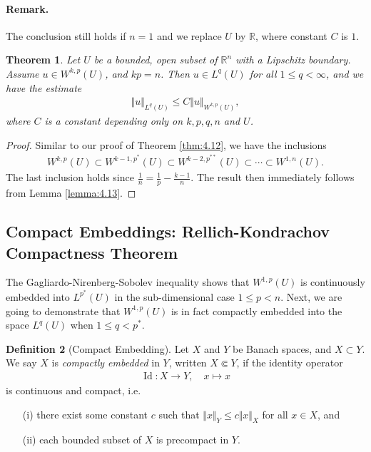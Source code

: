 \documentclass{article}
\numberwithin{equation}{section}
\newcommand{\bbR}{\mathbb{R}}
\DeclareMathOperator{\id}{Id}
\theoremstyle{plain}
\newtheorem{theorem}{Theorem}[section]
\theoremstyle{definition}
\newtheorem{definition}[theorem]{Definition}
\begin{document}
\paragraph{Remark.} The conclusion still holds if $n=1$ and we replace $U$ by $\bbR$, where constant $C$ is $1$.

\begin{theorem}\label{thm:4.14}
Let $U$ be a bounded, open subset of $\bbR^n$ with a Lipschitz boundary. Assume $u\in W^{k,p}(U)$, and $kp=n$. Then $u\in L^q(U)$ for all $1\leq q<\infty$, and we have the estimate
\begin{align*}
	\Vert u\Vert_{L^q(U)}\leq C\Vert u\Vert_{W^{k,p}(U)},
\end{align*}
where $C$ is a constant depending only on $k,p,q,n$ and $U$.
\end{theorem}
\begin{proof}
Similar to our proof of Theorem \ref{thm:4.12}, we have the inclusions
\begin{align*}
	W^{k,p}(U)\subset W^{k-1,p^*}(U)\subset W^{k-2,p^{**}}(U)\subset\cdots\subset W^{1,n}(U).
\end{align*}
The last inclusion holds since $\frac{1}{n}=\frac{1}{p}-\frac{k-1}{n}$. The result then immediately follows from Lemma \ref{lemma:4.13}.
\end{proof}

\newpage
\subsection{Compact Embeddings: Rellich-Kondrachov Compactness Theorem}
The Gagliardo-Nirenberg-Sobolev inequality shows that $W^{1,p}(U)$ is continuously embedded into $L^{p^*}(U)$ in the sub-dimensional case $1\leq p <n$. Next, we are going to demonstrate that $W^{1,p}(U)$ is in fact compactly embedded
into the space $L^q(U)$ when $1\leq q<p^*$.

\begin{definition}[Compact Embedding]\label{compactembedding}
Let $X$ and $Y$ be Banach spaces, and $X\subset Y$. We say $X$ is \textit{compactly embedded} in $Y$, written $X\Subset Y$, if the identity operator
\begin{align*}
	\id:X\to Y,\quad x\mapsto x
\end{align*}
is continuous and compact, i.e.
\begin{itemize}
	\item[(i)] there exist some constant $c$ such that $\Vert x\Vert_Y\leq c\Vert x\Vert_X$ for all $x\in X$, and
	\item[(ii)] each bounded subset of $X$ is precompact in $Y$.
\end{itemize}
\end{definition}
\end{document}

